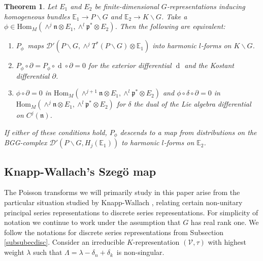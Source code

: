 \documentclass[a4paper,reqno]{amsart}
\numberwithin{equation}{section}
\def\rd{\operatorname{d}\!}
\newtheorem{thm}{Theorem}[section]
\theoremstyle{definition}
\theoremstyle{remark}
\begin{document}
\begin{thm}
Let $E_1$ and $E_2$ be finite-dimensional $G$-representations inducing homogeneous bundles $\mathbb{E}_1\to P\backslash G$ and $\mathbb{E}_2\to K\backslash G$. Take a $\phi\in  \mathrm{Hom}_M(\wedge^j\mathfrak{n}\otimes E_1,\wedge^l \mathfrak{p}^*\otimes E_2)$. Then the following are equivalent:
\begin{enumerate}
\item $P_\phi$ maps $\mathcal{D}'(P\backslash G,\wedge^jT^*(P\backslash G)\otimes \mathbb{E}_1)$ into harmonic $l$-forms on $K\backslash G$.
\item $P_\phi\circ \partial=P_\phi\circ \rd \circ \partial=0$ for the exterior differential $\rd$ and the Kostant differential $\partial$.
\item $\phi\circ \partial=0$ in $\mathrm{Hom}_M(\wedge^{j+1}\mathfrak{n}\otimes E_1,\wedge^l \mathfrak{p}^*\otimes E_2)$ and $\phi\circ \delta\circ \partial=0$ in $\mathrm{Hom}_M(\wedge^{j}\mathfrak{n}\otimes E_1,\wedge^l \mathfrak{p}^*\otimes E_2)$ for $\delta$ the dual of the Lie algebra differential on $C^j(\mathfrak{n})$.
\end{enumerate}
If either of these conditions hold, $P_\phi$ descends to a map from distributions on the BGG-complex $\mathcal{D}'(P\backslash G,H_j(\mathbb{E}_1))$ to harmonic $l$-forms on $\mathbb{E}_2$. 
\end{thm}


\subsection{Knapp-Wallach's Szegö map}
\label{subseclknlknad}

The Poisson transforms we will primarily study in this paper arise from the particular situation studied by Knapp-Wallach \cite{knappwallach}, relating certain non-unitary principal series representations to discrete series representations. For simplicity of notation we continue to work under the assumption that $G$ has real rank one. We follow the notations for discrete series representations from Subsection \ref{subsubecdisc}. Consider an irreducible $K$-representation $(\mathcal{V},\tau)$ with highest weight $\lambda$ such that $\Lambda=\lambda-\delta_n+\delta_k$ is non-singular. 
\end{document}
